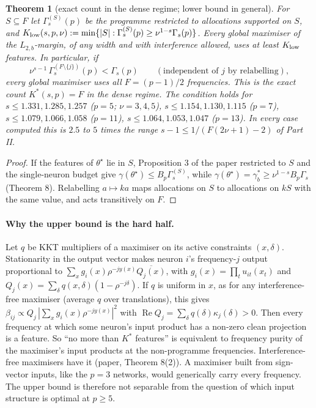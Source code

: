 \documentclass[11pt]{article}
\newtheorem{theorem}{Theorem}
\theoremstyle{definition}
\renewcommand{\Re}{\operatorname{Re}}
\begin{document}
\begin{theorem}[exact count in the dense regime; lower bound in general]\label{thm:dense}
For $S\subseteq F$ let $\Gamma_s^{(S)}(p)$ be the programme restricted to allocations supported on $S$, and
$K_{\rm low}(s,p,\nu):=\min\{|S|:\Gamma^{(S)}_s(p)\ge\nu^{1-s}\Gamma_s(p)\}$.  Every global maximiser of the $L_{2,b}$-margin,
of any width and with interference allowed, uses at least $K_{\rm low}$ features.  In particular, if
\[\nu^{s-1}\,\Gamma_s^{(F\setminus\{j\})}(p)<\Gamma_s(p)\qquad(\text{independent of }j\text{ by relabelling}),\]
every global maximiser uses all $F=(p-1)/2$ frequencies.  This is the exact count $K^*(s,p)=F$ in the dense regime.  The
condition holds for $s\le1.331,1.285,1.257$ ($p=5$; $\nu=3,4,5$), $s\le1.154,1.130,1.115$ ($p=7$), $s\le1.079,1.066,1.058$
($p=11$), $s\le1.064,1.053,1.047$ ($p=13$).  In every case computed this is $2.5$ to $5$ times the range $s-1\le1/(F(2\nu+1)-2)$ of Part II.
\end{theorem}
\begin{proof}
If the features of $\theta^\star$ lie in $S$, Proposition 3 of the paper restricted to $S$ and the single-neuron budget give
$\gamma(\theta^\star)\le B_p\Gamma_s^{(S)}$, while $\gamma(\theta^\star)=\gamma^*_b\ge\nu^{1-s}B_p\Gamma_s$ (Theorem 8).  Relabelling
$a\mapsto ka$ maps allocations on $S$ to allocations on $kS$ with the same value, and acts transitively on $F$.
\end{proof}
\paragraph{Why the upper bound is the hard half.}  Let $q$ be KKT multipliers of a maximiser on its active constraints
$(x,\delta)$.  Stationarity in the output vector makes neuron $i$'s frequency-$j$ output proportional to
$\sum_xg_i(x)\rho^{-jy(x)}\overline{Q_j(x)}$, with $g_i(x)=\prod_tu_{it}(x_t)$ and $Q_j(x)=\sum_\delta q(x,\delta)(1-\rho^{-j\delta})$.
If $q$ is uniform in $x$, as for any interference-free maximiser (average $q$ over translations), this gives
$\beta_{ij}\propto Q_j\,|\sum_xg_i(x)\rho^{-jy(x)}|^2$ with $\Re Q_j=\sum_\delta q(\delta)\kappa_j(\delta)>0$.  Then every frequency at which
some neuron's input product has a non-zero clean projection is a feature.  So ``no more than $K^*$ features'' is
equivalent to frequency purity of the maximiser's input products at the non-programme frequencies.  Interference-free
maximisers have it (paper, Theorem 8(2)).  A maximiser built from sign-vector inputs, like the $p=3$ networks, would
generically carry every frequency.  The upper bound is therefore not separable from the question of which
input structure is optimal at $p\ge5$.
\end{document}
